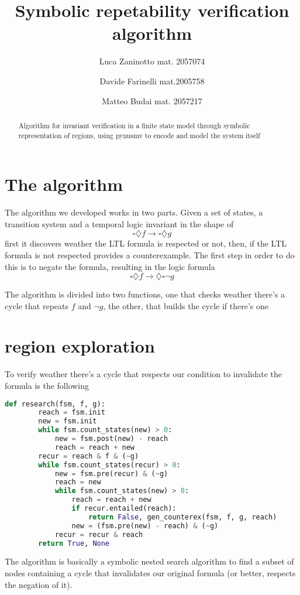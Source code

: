 \documentclass[9pt,oneside]{amsart}
\title{Symbolic repetability verification algorithm}
\author{
  Luca Zaninotto mat. 2057074 
  \and
  Davide Farinelli mat.2005758
  \and
  Matteo Budai mat. 2057217
}
\begin{document}
\begin{abstract}
  Algorithm for invariant verification in a finite state model through
  symbolic representation of regions, using pynusmv to encode and
  model the system itself
\end{abstract}
\maketitle
\setlength{\columnsep}{20pt}
\begin{multicols}{2}
  \section{The algorithm}\label{algo}
  The algorithm we developed works in two parts. Given a set of
  states, a transition system and a temporal logic invariant in the
  shape of
  \[
    \square \diamondsuit f \rightarrow \square \diamondsuit g
  \]
  first it discovers weather the LTL formula is respected or not,
  then, if the LTL formula is not respected provides a
  counterexample. The first step in order to do this is to negate the
  formula, resulting in the logic formula
  \[
    \square \diamondsuit f \rightarrow \diamondsuit \square \neg g
  \]

  The algorithm is divided into two functions, one that checks weather
  there's a cycle that repeats $f$ and $\neg g$, the other, that
  builds the cycle if there's one
  \section{region exploration}\label{explore}
  To verify weather there's a cycle that respects our condition to
  invalidate the formula is the following
  \begin{lstlisting}[language=Python]
  	def research(fsm, f, g):
  		reach = fsm.init
  		new = fsm.init
  		while fsm.count_states(new) > 0:
  			new = fsm.post(new) - reach
  			reach = reach + new
  		recur = reach & f & (~g)
  		while fsm.count_states(recur) > 0:
	  		new = fsm.pre(recur) & (~g)
		  	reach = new
		  	while fsm.count_states(new) > 0:
		  		reach = reach + new
		  		if recur.entailed(reach):
		  			return False, gen_counterex(fsm, f, g, reach)
		  		new = (fsm.pre(new) - reach) & (~g)
			recur = recur & reach
	  	return True, None
  \end{lstlisting}\label{code:reachable}
  The algorithm is basically a symbolic nested search algorithm to
  find a subset of nodes containing a cycle that invalidates our
  original formula (or better, respects the negation of it).


\end{multicols}
\end{document}
